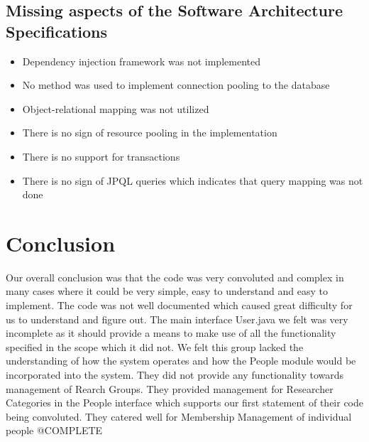 \documentclass{article}
\begin{document}
	\subsection{Missing aspects of the Software Architecture Specifications}
	\begin{itemize}
		\item Dependency injection framework was not implemented
		\item No method was used to implement connection pooling to the database
		\item Object-relational mapping was not utilized
		\item There is no sign of resource pooling in the implementation
		\item There is no support for transactions
		\item There is no sign of JPQL queries which indicates that query mapping was not done
		\item@TODO
	\end{itemize}
	













\section{Conclusion}
Our overall conclusion was that the code was very convoluted and complex in many cases where it could be very simple, easy to understand and easy to implement. The code was not well documented which caused great difficulty for us to understand and figure out. The main interface User.java we felt was very incomplete as it should provide a means to make use of all the functionality specified in the scope which it did not. We felt this group lacked the understanding of how the system operates and how the People module would be incorporated into the system. They did not provide any functionality towards management of Rearch Groups. They provided management for Researcher Categories in the People interface which supports our first statement of their code being convoluted. They catered well for Membership Management of individual people
@COMPLETE
\end{document}
